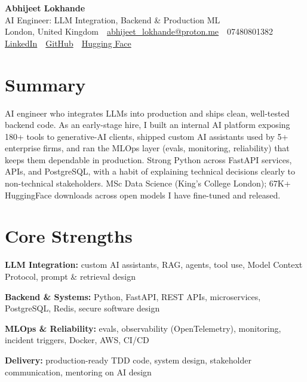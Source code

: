 \documentclass[10pt,a4paper]{article}
\newcommand{\sep}{\,\textcolor{accent!60}{\textbar}\,}
\begin{document}
\begin{center}
  {\fontsize{24}{26}\selectfont\bfseries Abhijeet Lokhande}\\[3pt]
  {\color{accent}\large AI Engineer: LLM Integration, Backend \& Production ML}\\[5pt]
  {\small
    London, United Kingdom \sep
    \href{mailto:abhijeet_lokhande@proton.me}{abhijeet\_lokhande@proton.me} \sep
    07480801382 \\[2pt]
    \href{https://www.linkedin.com/in/ablds/}{LinkedIn} \sep
    \href{https://github.com/abhijeetscode}{GitHub} \sep
    \href{https://huggingface.co/ab-ai}{Hugging Face}
  }
\end{center}
\vspace{2pt}

\section{Summary}
AI engineer who integrates LLMs into production and ships clean, well-tested backend code. As an early-stage hire, I built an internal AI platform exposing 180+ tools to generative-AI clients, shipped custom AI assistants used by 5+ enterprise firms, and ran the MLOps layer (evals, monitoring, reliability) that keeps them dependable in production. Strong Python across FastAPI services, APIs, and PostgreSQL, with a habit of explaining technical decisions clearly to non-technical stakeholders. MSc Data Science (King's College London); 67K+ HuggingFace downloads across open models I have fine-tuned and released.

\section{Core Strengths}
\begin{tight}
  \item[\textcolor{accent}{\small$\bullet$}] \textbf{LLM Integration:} custom AI assistants, RAG, agents, tool use, Model Context Protocol, prompt \& retrieval design
  \item[\textcolor{accent}{\small$\bullet$}] \textbf{Backend \& Systems:} Python, FastAPI, REST APIs, microservices, PostgreSQL, Redis, secure software design
  \item[\textcolor{accent}{\small$\bullet$}] \textbf{MLOps \& Reliability:} evals, observability (OpenTelemetry), monitoring, incident triggers, Docker, AWS, CI/CD
  \item[\textcolor{accent}{\small$\bullet$}] \textbf{Delivery:} production-ready TDD code, system design, stakeholder communication, mentoring on AI design
\end{tight}
\end{document}
